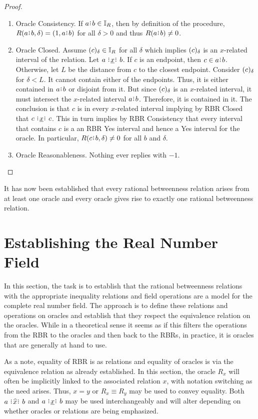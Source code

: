 \documentclass[12pt]{article}
\begin{document}
\begin{proof}
\begin{enumerate}
        \item Oracle Consistency. If $a\rint b \in \mathbb{I}_R$, then by definition of the procedure, $R(a\rint b, \delta) = (1, a\rint b)$ for all $\delta >0$ and thus $R(a\rint b) \neq 0$.
        
        \item Oracle Closed. Assume $(c)_{\delta} \in \mathbb{I}_R$ for all $\delta$ which implies $(c)_{\delta}$ is an $x$-related interval of the relation. Let $a \xrel b$. If $c$ is an endpoint, then $c \in a\rint b$. Otherwise, let $L$ be the distance from $c$ to the closest endpoint. Consider $(c)_{\delta}$ for $\delta < L$. It cannot contain either of the endpoints. Thus, it is either contained in $a\rint b$ or disjoint from it. But since $(c)_{\delta}$ is an $x$-related interval, it must intersect the $x$-related interval $a\rint b$. Therefore, it is contained in it. The conclusion is that $c$ is in every $x$-related interval implying by RBR Closed that $c \xrel c$. This in turn implies by RBR Consistency that every interval that contains $c$ is a an RBR Yes interval and hence a Yes interval for the oracle. In particular, $R(c\rint b, \delta) \neq 0$ for all $b$ and $\delta$. 

        \item Oracle Reasonableness. Nothing ever replies with $-1$. 
        
    \end{enumerate}
\end{proof}


It has now been established that every rational betweenness relation arises from at least one oracle and every oracle gives rise to exactly one rational betweenness relation. 


\section{Establishing the Real Number Field}

In this section, the task is to establish that the rational betweenness relations with the appropriate inequality relations and field operations are a model for the complete real number field. The approach is to define these relations and operations on oracles and establish that they respect the equivalence relation on the oracles. While in a theoretical sense it seems as if this filters the operations from the RBR to the oracles and then back to the RBRs, in practice, it is oracles that are generally at hand to use. 

As a note, equality of RBR is as relations and equality of oracles is via the equivalence relation as already established. In this section, the oracle $R_x$ will often be implicitly linked to the associated relation $x$, with notation switching as the need arises. Thus, $x = y$ or $R_x \equiv R_y$ may be used to convey equality. Both $a \xora b$ and $a \xrel b$ may be used interchangeably and will alter depending on whether oracles or relations are being emphasized. 
\end{document}
